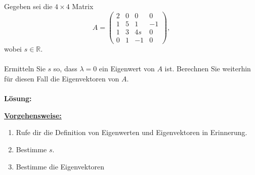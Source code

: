 \subsection*{}
Gegeben sei die $4 \times 4$ Matrix
\begin{equation*}
A= 
\begin{pmatrix}
2 & 0 &0 & 0 \\
1 & 5 & 1  & -1\\
1 & 3 & 4s & 0 \\
0 & 1 & -1 & 0
\end{pmatrix},
\end{equation*}
wobei $s \in \mathbb{R}$.\\ \\
Ermitteln Sie $s$ so, dass $\lambda = 0$ ein Eigenwert von $A$ ist.
Berechnen Sie weiterhin für diesen Fall die Eigenvektoren von $A$.
\\
\\
\textbf{Lösung:}
\begin{mdframed}
\underline{\textbf{Vorgehensweise:}}
\renewcommand{\labelenumi}{\theenumi.}
\begin{enumerate}
\item Rufe dir die Definition von Eigenwerten und Eigenvektoren in Erinnerung.
\item Bestimme $s$.
\item Bestimme die Eigenvektoren
\end{enumerate}
\end{mdframed}

